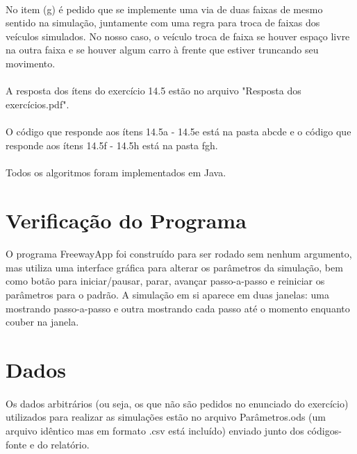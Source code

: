 \documentclass{article}
\begin{document}
\paragraph{}No item (g) é pedido que se implemente uma via de duas faixas de mesmo sentido na simulação, juntamente com uma regra para troca de faixas dos veículos simulados. No nosso caso, o veículo troca de faixa se houver espaço livre na outra faixa e se houver algum carro à frente que estiver truncando seu movimento.

\paragraph{}A resposta dos ítens do exercício 14.5 estão no arquivo "Resposta dos exercícios.pdf".

\paragraph{}O código que responde aos ítens 14.5a - 14.5e está na pasta abcde e o código que responde aos ítens 14.5f - 14.5h está na pasta fgh.

\paragraph{}Todos os algoritmos foram implementados em Java.

\section{Verificação do Programa}
\paragraph{}O programa FreewayApp foi construído para ser rodado sem nenhum argumento, mas utiliza uma interface gráfica para alterar os parâmetros da simulação, bem como botão para iniciar/pausar, parar, avançar passo-a-passo e reiniciar os parâmetros para o padrão. A simulação em si aparece em duas janelas: uma mostrando passo-a-passo e outra mostrando cada passo até o momento enquanto couber na janela.

\section{Dados}
\paragraph{}Os dados arbitrários (ou seja, os que não são pedidos no enunciado do exercício) utilizados para realizar as simulações estão no arquivo Parâmetros.ods (um arquivo idêntico mas em formato .csv está incluído) enviado junto dos códigos-fonte e do relatório.
\end{document}

